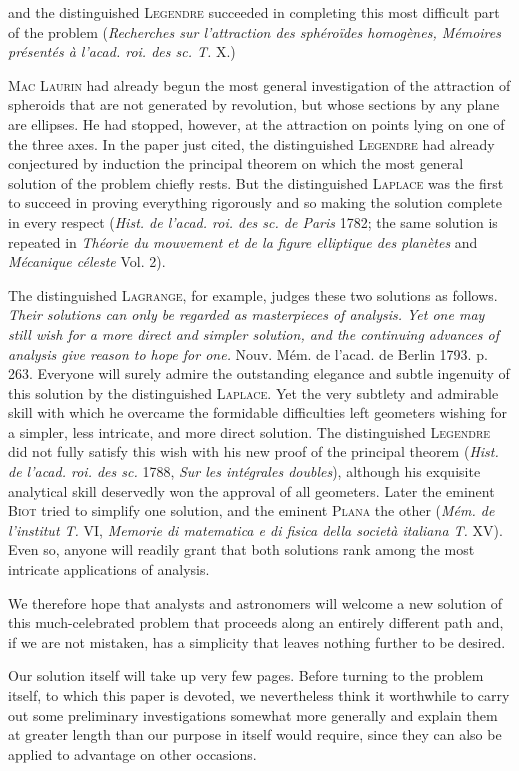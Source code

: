 and the distinguished \textsc{Legendre} succeeded in completing this most difficult part of the problem (\textit{Recherches sur l’attraction des sphéroïdes homogènes, Mémoires présentés à l’acad. roi. des sc. T.} X.)

\textsc{Mac Laurin} had already begun the most general investigation of the attraction of spheroids that are not generated by revolution, but whose sections by any plane are ellipses. He had stopped, however, at the attraction on points lying on one of the three axes. In the paper just cited, the distinguished \textsc{Legendre} had already conjectured by induction the principal theorem on which the most general solution of the problem chiefly rests. But the distinguished \textsc{Laplace} was the first to succeed in proving everything rigorously and so making the solution complete in every respect (\textit{Hist. de l’acad. roi. des sc. de Paris} 1782; the same solution is repeated in \textit{Théorie du mouvement et de la figure elliptique des planètes} and \textit{Mécanique céleste} Vol. 2).

\expandafter\def\csname HistoricalNoteText008\endcsname{The distinguished \textsc{Lagrange}, for example, judges these two solutions as follows. \textit{Their solutions can only be regarded as masterpieces of analysis. Yet one may still wish for a more direct and simpler solution, and the continuing advances of analysis give reason to hope for one.} Nouv. Mém. de l’acad. de Berlin 1793. p. 263.}
Everyone will surely admire the outstanding elegance and subtle ingenuity of this solution by the distinguished \textsc{Laplace}. Yet the very subtlety and admirable skill with which he overcame the formidable difficulties left geometers wishing for a simpler, less intricate, and more direct solution. The distinguished \textsc{Legendre} did not fully satisfy this wish with his new proof of the principal theorem (\textit{Hist. de l’acad. roi. des sc.} 1788, \textit{Sur les intégrales doubles}), although his exquisite analytical skill deservedly won the approval of all geometers. Later the eminent \textsc{Biot} tried to simplify one solution, and the eminent \textsc{Plana} the other (\textit{Mém. de l’institut T.} VI, \textit{Memorie di matematica e di fisica della società italiana T.} XV). Even so, anyone will readily grant that both solutions rank among the most intricate applications of analysis.

We therefore hope that analysts and astronomers will welcome a new solution of this much-celebrated problem that proceeds along an entirely different path and, if we are not mistaken, has a simplicity that leaves nothing further to be desired.

Our solution itself will take up very few pages. Before turning to the problem itself, to which this paper is devoted, we nevertheless think it worthwhile to carry out some preliminary investigations somewhat more generally and explain them at greater length than our purpose in itself would require, since they can also be applied to advantage on other occasions.
